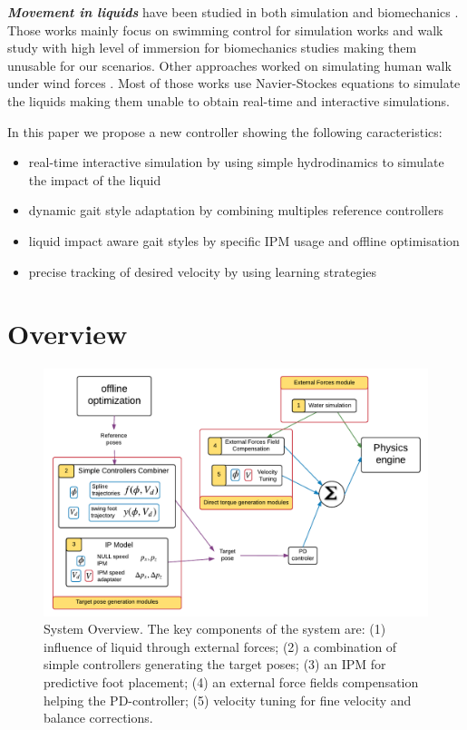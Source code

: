 \documentclass[conference]{acmsiggraph}
\begin{document}
\textbf{\textit{Movement in liquids}} have been studied in both simulation \cite{yang2004layered,si2014realistic} and biomechanics \cite{barela2006biomechanical,chevutschi2009comparison}. Those works mainly focus on swimming control for simulation works and walk study with high level of immersion for biomechanics studies making them unusable for our scenarios. Other approaches worked on simulating human walk under wind forces \cite{lentine2011creature}. Most of those works use Navier-Stockes equations to simulate the liquids making them unable to obtain real-time and interactive simulations.

 In this paper we propose a new controller showing the following caracteristics:
\begin{itemize}
\item{real-time interactive simulation by using simple hydrodinamics to simulate the impact of the liquid}
\item{dynamic gait style adaptation by combining multiples reference controllers}
\item{liquid impact aware gait styles by specific IPM usage and offline optimisation}
\item{precise tracking of desired velocity by using learning strategies}
\end{itemize}

\section{Overview}
\label{sec:overview}

\begin{figure}[t]
\centering
\includegraphics[scale=0.45]{images/general_process.pdf}
\caption{System Overview. The key components of the system are: (1) influence of liquid through external forces; (2) a combination of simple controllers generating the target poses; (3) an IPM for predictive foot placement; (4) an external force fields compensation helping the PD-controller; (5) velocity tuning for fine velocity and balance corrections.}
\label{fig:shema_controler}
\end{figure}
\end{document}
